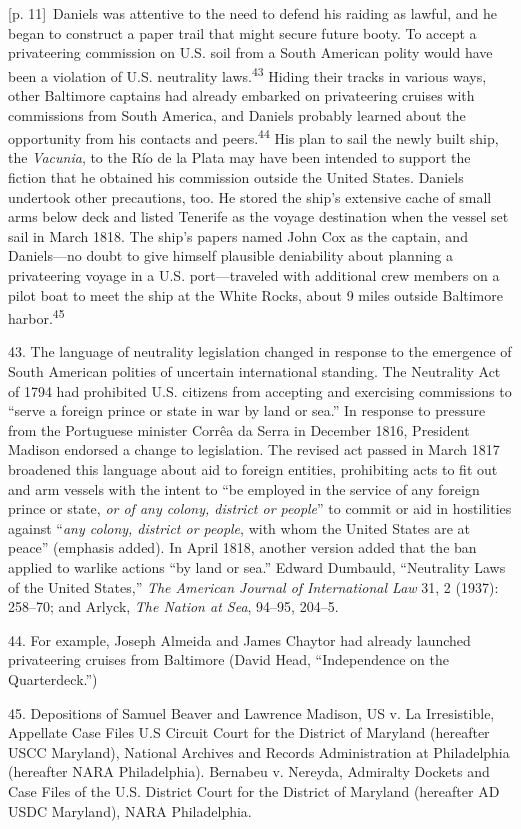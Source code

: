 \documentclass[10pt,a4paper]{article}
\begin{document}
{\scriptsize\color{gray} [p. 11]}\ Daniels was attentive to the need to defend his raiding as lawful, and he began to construct a paper trail that might secure future booty. To accept a privateering commission on U.S. soil from a South American polity would have been a violation of U.S. neutrality laws.\nobreak\textsuperscript{43} Hiding their tracks in various ways, other Baltimore captains had already embarked on privateering cruises with commissions from South America, and Daniels probably learned about the opportunity from his contacts and peers.\nobreak\textsuperscript{44} His plan to sail the newly built ship, the \textit{Vacunia}, to the Río de la Plata may have been intended to support the fiction that he obtained his commission outside the United States. Daniels undertook other precautions, too. He stored the ship’s extensive cache of small arms below deck and listed Tenerife as the voyage destination when the vessel set sail in March 1818. The ship’s papers named John Cox as the captain, and Daniels—no doubt to give himself plausible deniability about planning a privateering voyage in a U.S. port—traveled with additional crew members on a pilot boat to meet the ship at the White Rocks, about 9 miles outside Baltimore harbor.\nobreak\textsuperscript{45}\par{\small 43. The language of neutrality legislation changed in response to the emergence of South American polities of uncertain international standing. The Neutrality Act of 1794 had prohibited U.S. citizens from accepting and exercising commissions to “serve a foreign prince or state in war by land or sea.” In response to pressure from the Portuguese minister Corrêa da Serra in December 1816, President Madison endorsed a change to legislation. The revised act passed in March 1817 broadened this language about aid to foreign entities, prohibiting acts to fit out and arm vessels with the intent to “be employed in the service of any foreign prince or state, \textit{or of any colony, district or people}” to commit or aid in hostilities against “\textit{any colony, district or people}, with whom the United States are at peace” (emphasis added). In April 1818, another version added that the ban applied to warlike actions “by land or sea.” Edward Dumbauld, “Neutrality Laws of the United States,” \textit{The American Journal of International Law} 31, 2 (1937): 258–70; and Arlyck, \textit{The Nation at Sea}, 94–95, 204–5.\par}{\small 44. For example, Joseph Almeida and James Chaytor had already launched privateering cruises from Baltimore (David Head, “Independence on the Quarterdeck.”)\par}{\small 45. Depositions of Samuel Beaver and Lawrence Madison, US v. La Irresistible, Appellate Case Files U.S Circuit Court for the District of Maryland (hereafter USCC Maryland), National Archives and Records Administration at Philadelphia (hereafter NARA Philadelphia). Bernabeu v. Nereyda, Admiralty Dockets and Case Files of the U.S. District Court for the District of Maryland (hereafter AD USDC Maryland), NARA Philadelphia.\par}
\end{document}
